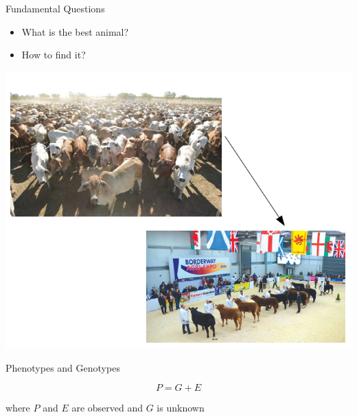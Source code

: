 \documentclass[ignorenonframetext,]{beamer}
\providecommand{\tightlist}{%
  \setlength{\itemsep}{0pt}\setlength{\parskip}{0pt}}
\begin{document}
\begin{frame}{Fundamental Questions}
\protect\hypertarget{fundamental-questions}{}

\begin{itemize}
\tightlist
\item
  What is the best animal?
\item
  How to find it?
\end{itemize}

\includegraphics{odg/bestanimal.png}


\end{frame}

\begin{frame}{Phenotypes and Genotypes}
\protect\hypertarget{phenotypes-and-genotypes}{}

\[
P = G + E
\]

where \(P\) and \(E\) are observed and \(G\) is unknown


\end{frame}
\end{document}
